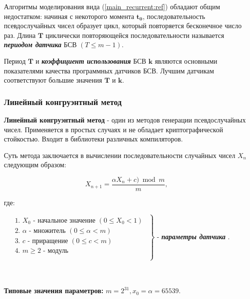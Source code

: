 Алгоритмы моделирования вида (\ref{main_recurrent:ref}) обладают общим недостатком: начиная с некоторого момента $\mathbf{t_{0}}$, последовательность псевдослучайных чисел образует цикл, который повторяется бесконечное число раз. Длина $\mathbf{T}$ циклически повторяющейся последовательности называется \textbf{\textit{периодом датчика}} БСВ $(T \leq m - 1)$.

Период $\mathbf{T}$ и \textbf{\textit{коэффициент использования}} БСВ $\mathbf{k}$ являются основными показателями качества программных датчиков БСВ. Лучшим датчикам соответствуют большие значения $\mathbf{T}$ и $\mathbf{k}$.

\subsubsection {Линейный конгруэнтный метод}\label{linear_congruential_generator}
\textbf{Линейный конгруэнтный метод} - один из методов генерации псевдослучайных чисел. Применяется в простых случаях и не обладает криптографической стойкостью. Входит в библиотеки различных компиляторов.

Суть метода заключается в вычислении последовательности случайных чисел $X_n$ следующим образом:

\begin{equation}
	X_{n+1} = \frac{\alpha X_{n} + c) \bmod m}{m},
	\label{linear_congruential_generator_formula:ref}
\end{equation}

где:

\hfill\parbox{17.5cm}{
	$
		\left.
		\begin{array}{ccc}
			\begin{aligned}
				 & \text{1. } X_{0} \text{ - начальное значение } (0 \leqslant X_{0} < 1) \\
				 & \text{2. } \alpha \text{ - множитель } (0 \leqslant \alpha < m)        \\
				 & \text{3. } c \text{ - приращение } (0 \leqslant c < m )                \\
				 & \text{4. } m \geq 2 \text{ - модуль }                                  \\
			\end{aligned}
		\end{array}
		\right\}
	$ - \textbf{\textit{параметры датчика
	}}.
}\\\\

\textbf{Типовые значения параметров:} $m = 2^{31}, x_0 = \alpha = 65539$.
